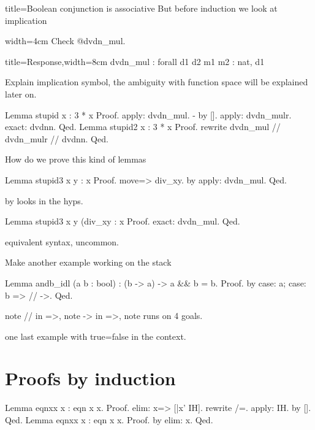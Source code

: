 \begin{coq}{title=Boolean conjunction is associative}
But before induction we look at implication

\mcbREQUIRE{}

\begin{coq}{width=4cm}
Check @dvdn_mul.
\end{coq}
\begin{coqout}{title=Response,width=8cm}
dvdn_mul : forall d1 d2 m1 m2 : nat,
  d1 %
\end{coqout}

Explain implication symbol, the ambiguity with function space will
be explained later on.

\begin{coq}{}
Lemma stupid x : 3 * x %
Proof.
apply: dvdn_mul.
- by [].
apply: dvdn_mulr.
exact: dvdnn.
Qed.
Lemma stupid2 x : 3 * x %
Proof.
rewrite dvdn_mul // dvdn_mulr // dvdnn.
Qed.
\end{coq}

How do we prove this kind of lemmas

\begin{coq}{}
Lemma stupid3 x y : x %
Proof.
move=> div_xy.
by apply: dvdn_mul.
Qed.
\end{coq}

by looks in the hyps.

\begin{coq}{}
Lemma stupid3 x y (div_xy : x %
Proof. exact: dvdn_mul. Qed.
\end{coq}

equivalent syntax, uncommon.

Make another example working on the stack

\begin{coq}{}
Lemma andb_idl (a b : bool) : (b -> a) -> a && b = b.
Proof. by case: a; case: b => // ->. Qed.
\end{coq}

note // in =>, note -> in =>, note runs on 4 goals.

one last example with true=false in the context.

\section{Proofs by induction}

\begin{coq}{}
Lemma eqnxx x : eqn x x.
Proof.
elim: x=> [|x' IH].
rewrite /=.
apply: IH.
by [].
Qed.
Lemma eqnxx x : eqn x x.
Proof. by elim: x. Qed.
\end{coq}


\end{coq}
